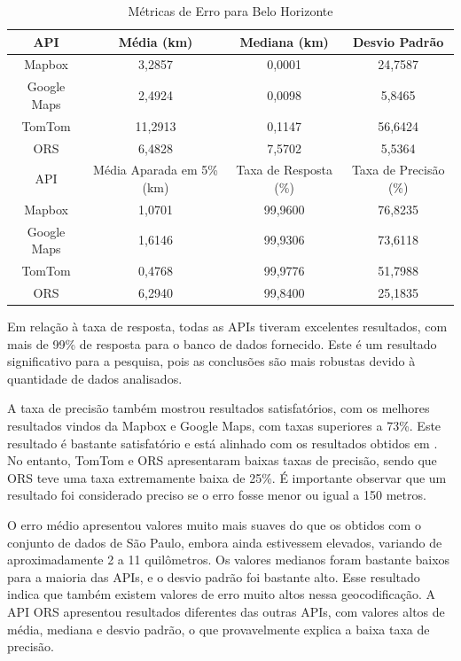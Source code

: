 \begin{table}[!ht]
    \centering
    \caption{Métricas de Erro para Belo Horizonte}
    \label{tab:tabelaDeMetricasBH}
    \begin{adjustbox}{width=0.7\textwidth}
    \begin{tabular}{|c|c|c|c|}
    \hline
    API & Média (km) & Mediana (km) & Desvio Padrão \\
    \hline
    Mapbox & 3,2857 & 0,0001 & 24,7587 \\
    Google Maps & 2,4924 & 0,0098 & 5,8465 \\
    TomTom & 11,2913 & 0,1147 & 56,6424 \\
    ORS & 6,4828 & 7,5702 & 5,5364 \\
    \hline
    \hline
    API & Média Aparada em 5\% (km) & Taxa de Resposta (\%) & Taxa de Precisão (\%) \\
    \hline
    Mapbox & 1,0701 & 99,9600 & 76,8235 \\
    Google Maps & 1,6146 & 99,9306 & 73,6118 \\
    TomTom & 0,4768 & 99,9776 & 51,7988 \\
    ORS & 6,2940 & 99,8400 & 25,1835 \\
    \hline
    \end{tabular}
    \end{adjustbox}
\end{table}

Em relação à taxa de resposta, todas as APIs tiveram excelentes resultados, com mais de 99\% de resposta para o banco de dados fornecido. Este é um resultado significativo para a pesquisa, pois as conclusões são mais robustas devido à quantidade de dados analisados.

A taxa de precisão também mostrou resultados satisfatórios, com os melhores resultados vindos da Mapbox e Google Maps, com taxas superiores a 73\%. Este resultado é bastante satisfatório e está alinhado com os resultados obtidos em \cite{Clodoveu2011}. No entanto, TomTom e ORS apresentaram baixas taxas de precisão, sendo que ORS teve uma taxa extremamente baixa de 25\%. É importante observar que um resultado foi considerado preciso se o erro fosse menor ou igual a 150 metros.

O erro médio apresentou valores muito mais suaves do que os obtidos com o conjunto de dados de São Paulo, embora ainda estivessem elevados, variando de aproximadamente 2 a 11 quilômetros. Os valores medianos foram bastante baixos para a maioria das APIs, e o desvio padrão foi bastante alto. Esse resultado indica que também existem valores de erro muito altos nessa geocodificação. A API ORS apresentou resultados diferentes das outras APIs, com valores altos de média, mediana e desvio padrão, o que provavelmente explica a baixa taxa de precisão.

